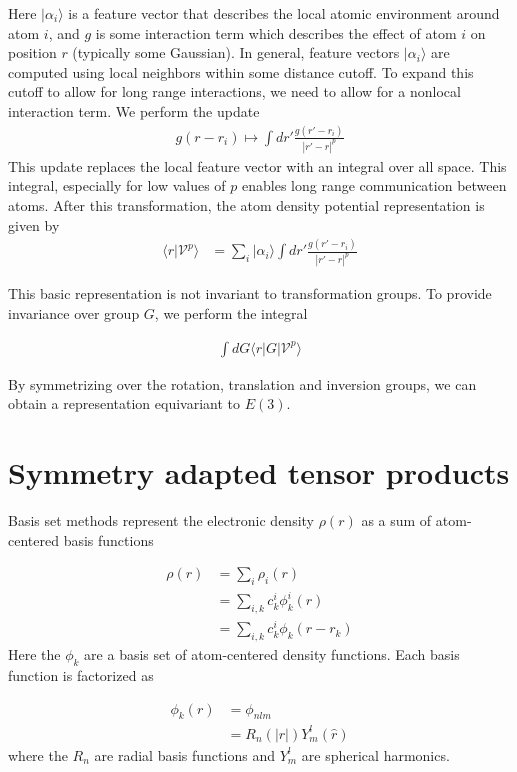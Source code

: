 \documentclass[book.tex]{subfiles}
\begin{document}
Here $|\alpha_i \rangle$ is a feature vector that describes the local atomic environment around atom $i$, and $g$ is some interaction term which describes the effect of atom $i$ on position $r$ (typically some Gaussian). In general, feature vectors $|\alpha_i \rangle$ are computed using local neighbors within some distance cutoff. To expand this cutoff to allow for long range interactions, we need to allow for a nonlocal interaction term. We perform the update
\begin{align}
g(r-r_i) \mapsto \int dr' \frac{g(r'-r_i)}{|r' - r|^p}
\end{align}
This update replaces the local feature vector with an integral over all space. This integral, especially for low values of $p$ enables long range communication between atoms. After this transformation, the atom density potential representation is given by
\begin{align}
    \langle r | \mathcal{V}^p \rangle &= \sum_i |\alpha_i \rangle \int dr' \frac{g(r'-r_i)}{|r'-r|^p
    }
\end{align}

This basic representation is not invariant to transformation groups. To provide invariance over group $G$, we perform the integral

\begin{align}
\int dG \langle r | G | \mathcal{V}^p \rangle
\end{align}

By symmetrizing over the rotation, translation and inversion groups, we can obtain a representation equivariant to $E(3)$.

\section{Symmetry adapted tensor products}

Basis set methods represent the electronic density $\rho(r)$ as a sum of atom-centered basis functions

\begin{align}
    \rho(r) &= \sum_i \rho_i(r) \\
    &= \sum_{i, k} c^i_k \phi^i_k(r) \\
    &= \sum_{i, k} c^i_k \phi_k(r-r_k)
\end{align}
Here the $\phi_k$ are a basis set of atom-centered density functions. Each basis function is factorized as

\begin{align}
    \phi_k(r) &= \phi_{nlm} \\
    &= R_n(|r|)Y^l_m(\hat{r}) 
\end{align}
where the $R_n$ are radial basis functions and $Y^l_m$ are spherical harmonics. 
\end{document}
